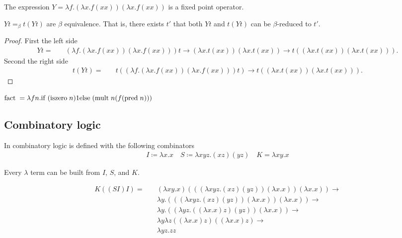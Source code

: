 \begin{definition}
    The expression $Y = \lambda f.(\lambda x. f(xx))(\lambda x. f(xx))$ is a fixed point operator.
\end{definition}



\begin{theorem}
	$Yt =_{\beta} t(Yt)$  are $\beta$ equivalence. That is, 
there exists $t'$ that both $Yt$ and $t(Yt)$ can be $\beta$-reduced to $t'$.
\end{theorem}
\begin{proof}
    First the left side
    \begin{align*}
        Yt= \quad & (\lambda f.(\lambda x.f(xx))(\lambda x. f(xx)))t \to (\lambda x. t(xx))(\lambda x. t(xx)) \to t((\lambda x. t(xx))(\lambda x. t(xx))).
    \end{align*}
    Second the right side 
	\begin{align*}
        t(Yt)= \quad &  t((\lambda f.(\lambda x.f(xx))(\lambda x. f(xx)))t) \to t((\lambda x. t(xx))(\lambda x. t(xx))).
    \end{align*}
\end{proof}

\begin{example}
	$\mathrm{fact}\; = \lambda fn. \mathrm{if} \;(\mathrm{iszero } \;n) 1 \mathrm{ else} \;(\mathrm{mult }\; n(f (\mathrm{pred }\; n)))$
\end{example}


\subsection{Combinatory logic}


\begin{definition}
    In combinatory logic is defined with the following combinators
    \begin{align*}
        I \coloneqq \lambda x.x \quad  S \coloneqq \lambda xyz. (xz)(yz) \quad K = \lambda xy.x
    \end{align*}
\end{definition}


\begin{theorem}
Every $\lambda$ term can be built from $I$, $S$, and $K$.
\end{theorem}

\begin{example}
    \begin{align*}
        K((SI)I) =\quad & (\lambda xy.x)(((\lambda xyz. (xz)(yz))(\lambda x.x))(\lambda x.x))\to  \\
        &\lambda y. (((\lambda xyz. (xz)(yz))(\lambda x.x))(\lambda x.x))
        \to \\
        &\lambda y. ((\lambda yz.((\lambda x.x)z)(yz))(\lambda x.x))\to  \\
       & \lambda y \lambda z ((\lambda x.x)z)((\lambda x.x)z) \to \\
       &\lambda yz. zz
    \end{align*}
\end{example}


